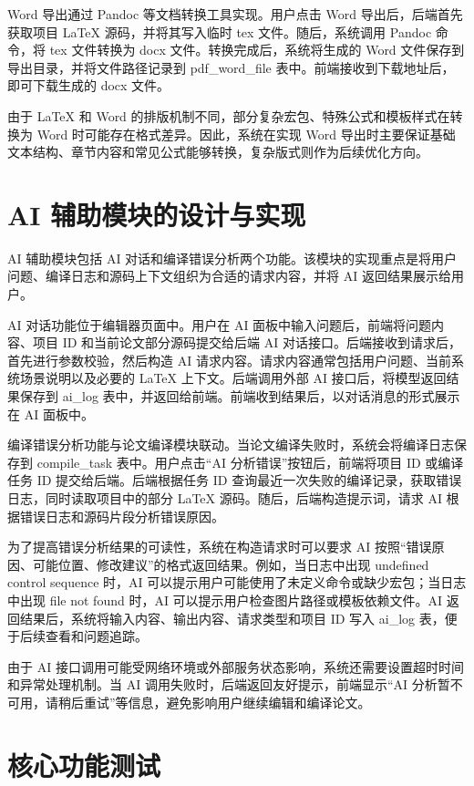 \documentclass{xduugthesis}
\begin{document}
Word 导出通过 Pandoc 等文档转换工具实现。用户点击 Word 导出后，后端首先获取项目 LaTeX 源码，并将其写入临时 tex 文件。随后，系统调用 Pandoc 命令，将 tex 文件转换为 docx 文件。转换完成后，系统将生成的 Word 文件保存到导出目录，并将文件路径记录到 pdf\_word\_file 表中。前端接收到下载地址后，即可下载生成的 docx 文件。

由于 LaTeX 和 Word 的排版机制不同，部分复杂宏包、特殊公式和模板样式在转换为 Word 时可能存在格式差异。因此，系统在实现 Word 导出时主要保证基础文本结构、章节内容和常见公式能够转换，复杂版式则作为后续优化方向\cite{krewinkel2017pandoc}。

\section{AI 辅助模块的设计与实现}
AI 辅助模块包括 AI 对话和编译错误分析两个功能。该模块的实现重点是将用户问题、编译日志和源码上下文组织为合适的请求内容，并将 AI 返回结果展示给用户。

AI 对话功能位于编辑器页面中。用户在 AI 面板中输入问题后，前端将问题内容、项目 ID 和当前论文部分源码提交给后端 AI 对话接口。后端接收到请求后，首先进行参数校验，然后构造 AI 请求内容。请求内容通常包括用户问题、当前系统场景说明以及必要的 LaTeX 上下文。后端调用外部 AI 接口后，将模型返回结果保存到 ai\_log 表中，并返回给前端。前端收到结果后，以对话消息的形式展示在 AI 面板中。

编译错误分析功能与论文编译模块联动。当论文编译失败时，系统会将编译日志保存到 compile\_task 表中。用户点击“AI 分析错误”按钮后，前端将项目 ID 或编译任务 ID 提交给后端。后端根据任务 ID 查询最近一次失败的编译记录，获取错误日志，同时读取项目中的部分 LaTeX 源码。随后，后端构造提示词，请求 AI 根据错误日志和源码片段分析错误原因。

为了提高错误分析结果的可读性，系统在构造请求时可以要求 AI 按照“错误原因、可能位置、修改建议”的格式返回结果。例如，当日志中出现 undefined control sequence 时，AI 可以提示用户可能使用了未定义命令或缺少宏包；当日志中出现 file not found 时，AI 可以提示用户检查图片路径或模板依赖文件。AI 返回结果后，系统将输入内容、输出内容、请求类型和项目 ID 写入 ai\_log 表，便于后续查看和问题追踪。

由于 AI 接口调用可能受网络环境或外部服务状态影响，系统还需要设置超时时间和异常处理机制。当 AI 调用失败时，后端返回友好提示，前端显示“AI 分析暂不可用，请稍后重试”等信息，避免影响用户继续编辑和编译论文。

\section{核心功能测试}
\end{document}
